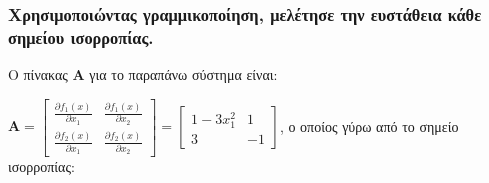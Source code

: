\documentclass{article}
\begin{document}
\subsubsection{Χρησιμοποιώντας γραμμικοποίηση, μελέτησε την ευστάθεια κάθε σημείου ισορροπίας.}
Ο πίνακας \(\textbf{A}\) για το παραπάνω σύστημα είναι:

\hfill\break
\begin{math}
    \textbf{A} =
    \begin{bmatrix}
        \frac{\partial f_1(x)}{\partial x_1} & \frac{\partial f_1(x)}{\partial x_2} \\
        \frac{\partial f_2(x)}{\partial x_1} & \frac{\partial f_2(x)}{\partial x_2}
    \end{bmatrix} =
    \begin{bmatrix}
        1 - 3x_1^2 &  1 \\
                 3 & -1
    \end{bmatrix}
\end{math}, ο οποίος γύρω από το σημείο ισορροπίας:
\end{document}
